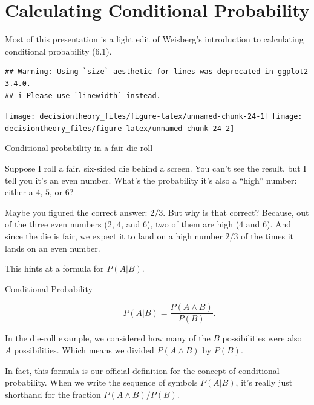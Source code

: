 \documentclass[]{tufte-book}
\begin{document}
\hypertarget{calculating-conditional-probability}{%
\section{Calculating Conditional Probability}\label{calculating-conditional-probability}}

\begin{marginfigure}
Most of this presentation is a light edit of Weisberg's introduction to
calculating conditional probability (6.1).
\end{marginfigure}

\begin{verbatim}
## Warning: Using `size` aesthetic for lines was deprecated in ggplot2 3.4.0.
## i Please use `linewidth` instead.
\end{verbatim}

\begin{marginfigure}
\texttt{[image: decisiontheory\_files/figure-latex/unnamed-chunk-24-1]} \texttt{[image: decisiontheory\_files/figure-latex/unnamed-chunk-24-2]} \caption[Conditional probability in a fair die roll]{Conditional probability in a fair die roll}\label{fig:unnamed-chunk-24}
\end{marginfigure}

Suppose I roll a fair, six-sided die behind a screen. You can't see the result, but I tell you it's an even number. What's the probability it's also a ``high'' number: either a \(4\), \(5\), or \(6\)?

Maybe you figured the correct answer: \(2/3\). But why is that correct? Because, out of the three even numbers (\(2\), \(4\), and \(6\)), two of them are high (\(4\) and \(6\)). And since the die is fair, we expect it to land on a high number \(2/3\) of the times it lands on an even number.

This hints at a formula for \(P(A | B)\).

\begin{description}
\item[Conditional Probability]
\[ P(A | B) = \frac{P(A \wedge B)}{P(B)}. \]
\end{description}

In the die-roll example, we considered how many of the \(B\) possibilities were also \(A\) possibilities. Which means we divided \(P(A \wedge B)\) by \(P(B)\).

In fact, this formula is our official definition for the concept of conditional probability. When we write the sequence of symbols \(P(A | B)\), it's really just shorthand for the fraction \(P(A \wedge B) / P(B)\).
\end{document}

